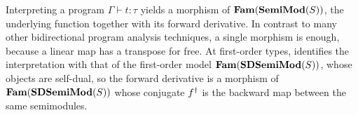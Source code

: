 Interpreting a program $\Gamma \vdash t : \tau$ yields a morphism of $\mathbf{Fam}(\mathbf{SemiMod}(S))$, the
underlying function together with its forward derivative. In contrast to many other bidirectional program
analysis techniques, a single morphism is enough, because a linear map has a transpose for free. At first-order types,  identifies the
interpretation with that of the first-order model $\mathbf{Fam}(\mathbf{SDSemiMod}(S))$, whose objects are self-dual, so the
forward derivative is a morphism of $\mathbf{Fam}(\mathbf{SDSemiMod}(S))$ whose conjugate $f^{\dagger}$ is the backward map
between the same semimodules. 



